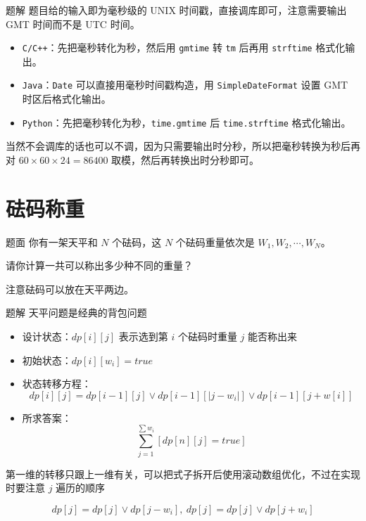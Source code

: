 \documentclass{pptt}
\begin{document}
\begin{frame}{题解}
    题目给的输入即为毫秒级的 UNIX 时间戳，直接调库即可，注意需要输出 GMT 时间而不是 UTC 时间。

    \begin{itemize}
        \item \texttt{C/C++}：先把毫秒转化为秒，然后用 \texttt{gmtime} 转 \texttt{tm} 后再用 \texttt{strftime} 格式化输出。
        \item \texttt{Java}：\texttt{Date} 可以直接用毫秒时间戳构造，用 \texttt{SimpleDateFormat} 设置 GMT 时区后格式化输出。
        \item \texttt{Python}：先把毫秒转化为秒，\texttt{time.gmtime} 后 \texttt{time.strftime} 格式化输出。
    \end{itemize}

    当然不会调库的话也可以不调，因为只需要输出时分秒，所以把毫秒转换为秒后再对 $60 \times 60 \times 24=86400$ 取模，然后再转换出时分秒即可。
\end{frame}

\section{砝码称重}

\begin{frame}{题面}
    你有一架天平和 $N$ 个砝码，这 $N$ 个砝码重量依次是 $W_1,W_2,\cdots,W_N$。

    请你计算一共可以称出多少种不同的重量？

    注意砝码可以放在天平两边。
\end{frame}

\begin{frame}{题解}
    天平问题是经典的背包问题

    \begin{itemize}
        \item 设计状态：$dp[i][j]$ 表示选到第 $i$ 个砝码时重量 $j$ 能否称出来
        \item 初始状态：$dp[i][w_i]=true$
        \item 状态转移方程：$$dp[i][j]=dp[i-1][j] \lor dp[i-1][|j-w_i|] \lor dp[i-1][j+w[i]]$$
        \item 所求答案：$$\sum_{j=1}^{\sum w_i}[dp[n][j]=true]$$
    \end{itemize}

    第一维的转移只跟上一维有关，可以把式子拆开后使用滚动数组优化，不过在实现时要注意 $j$ 遍历的顺序

    $$dp[j]=dp[j] \lor dp[j-w_i],~dp[j]=dp[j] \lor dp[j+w_i]$$
\end{frame}
\end{document}
